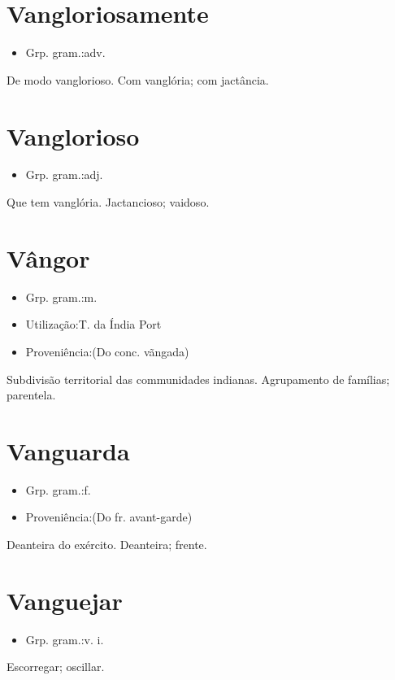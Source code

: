 \documentclass{article}
\begin{document}
\section{Vangloriosamente}
\begin{itemize}
\item {Grp. gram.:adv.}
\end{itemize}
De modo vanglorioso.
Com vanglória; com jactância.
\section{Vanglorioso}
\begin{itemize}
\item {Grp. gram.:adj.}
\end{itemize}
Que tem vanglória.
Jactancioso; vaidoso.
\section{Vângor}
\begin{itemize}
\item {Grp. gram.:m.}
\end{itemize}
\begin{itemize}
\item {Utilização:T. da Índia Port}
\end{itemize}
\begin{itemize}
\item {Proveniência:(Do conc. \textunderscore vãngada\textunderscore )}
\end{itemize}
Subdivisão territorial das communidades indianas.
Agrupamento de famílias; parentela.
\section{Vanguarda}
\begin{itemize}
\item {Grp. gram.:f.}
\end{itemize}
\begin{itemize}
\item {Proveniência:(Do fr. \textunderscore avant-garde\textunderscore )}
\end{itemize}
Deanteira do exército.
Deanteira; frente.
\section{Vanguejar}
\begin{itemize}
\item {Grp. gram.:v. i.}
\end{itemize}
Escorregar; oscillar.
\end{document}

